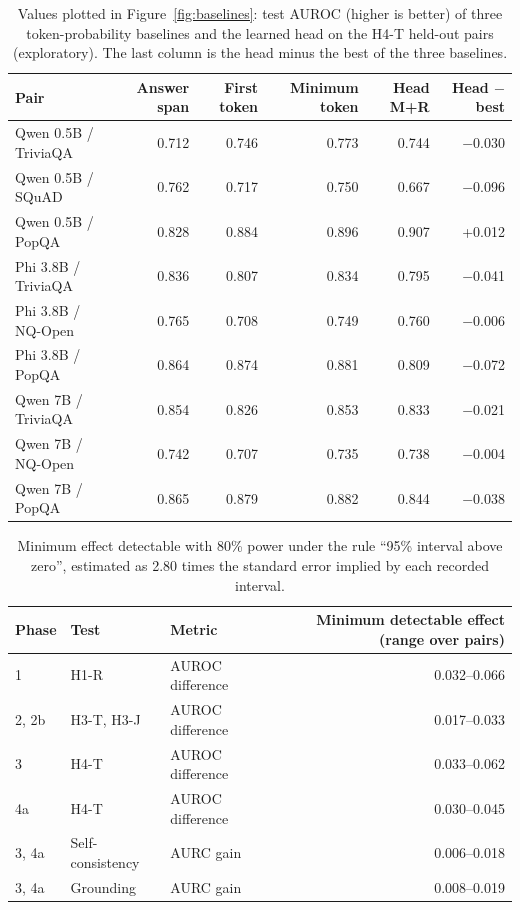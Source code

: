 \documentclass[10pt]{article}
\begin{document}
\begin{table}[h]
\centering
\small
\begin{tabular}{@{}lrrrrr@{}}
\toprule
Pair & Answer span & First token & Minimum token & Head M+R & Head $-$ best \\
\midrule
Qwen 0.5B / TriviaQA & 0.712 & 0.746 & 0.773 & 0.744 & $-$0.030 \\
Qwen 0.5B / SQuAD & 0.762 & 0.717 & 0.750 & 0.667 & $-$0.096 \\
Qwen 0.5B / PopQA & 0.828 & 0.884 & 0.896 & 0.907 & +0.012 \\
Phi 3.8B / TriviaQA & 0.836 & 0.807 & 0.834 & 0.795 & $-$0.041 \\
Phi 3.8B / NQ-Open & 0.765 & 0.708 & 0.749 & 0.760 & $-$0.006 \\
Phi 3.8B / PopQA & 0.864 & 0.874 & 0.881 & 0.809 & $-$0.072 \\
Qwen 7B / TriviaQA & 0.854 & 0.826 & 0.853 & 0.833 & $-$0.021 \\
Qwen 7B / NQ-Open & 0.742 & 0.707 & 0.735 & 0.738 & $-$0.004 \\
Qwen 7B / PopQA & 0.865 & 0.879 & 0.882 & 0.844 & $-$0.038 \\
\bottomrule
\end{tabular}
\caption{Values plotted in Figure~\ref{fig:baselines}: test AUROC (higher is better) of three token-probability baselines and the learned head on the H4-T held-out pairs (exploratory). The last column is the head minus the best of the three baselines.}
\label{tab:baselines}
\end{table}

\begin{table}[h]
\centering
\small
\begin{tabular}{@{}lllr@{}}
\toprule
Phase & Test & Metric & Minimum detectable effect (range over pairs) \\
\midrule
1 & H1-R & AUROC difference & 0.032--0.066 \\
2, 2b & H3-T, H3-J & AUROC difference & 0.017--0.033 \\
3 & H4-T & AUROC difference & 0.033--0.062 \\
4a & H4-T & AUROC difference & 0.030--0.045 \\
3, 4a & Self-consistency & AURC gain & 0.006--0.018 \\
3, 4a & Grounding & AURC gain & 0.008--0.019 \\
\bottomrule
\end{tabular}
\caption{Minimum effect detectable with 80\% power under the rule ``95\% interval above zero'', estimated as 2.80 times the standard error implied by each recorded interval.}
\label{tab:mde}
\end{table}
\end{document}
